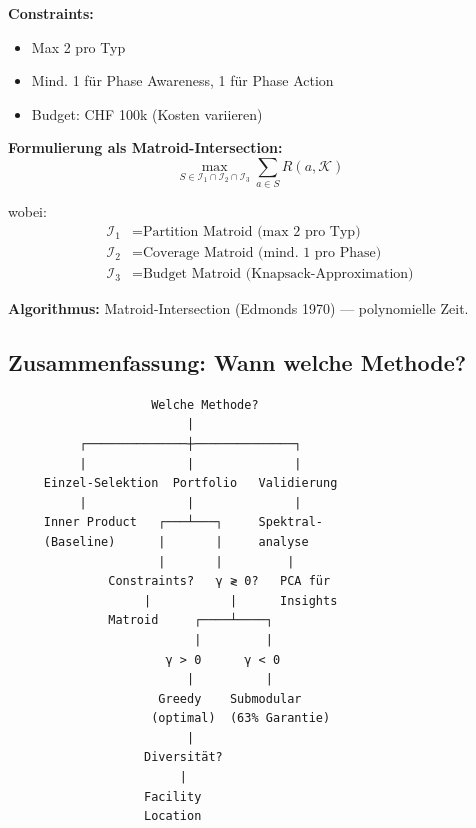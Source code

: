 \begin{tcolorbox}[colback=yellow!5!white, colframe=yellow!75!black,
    title=\textbf{Beispiel: Constrained Portfolio Selection}]

\textbf{Constraints:}
\begin{itemize}[nosep]
    \item Max 2 pro Typ
    \item Mind. 1 für Phase Awareness, 1 für Phase Action
    \item Budget: CHF 100k (Kosten variieren)
\end{itemize}

\textbf{Formulierung als Matroid-Intersection:}
\begin{equation}
\max_{S \in \mathcal{I}_1 \cap \mathcal{I}_2 \cap \mathcal{I}_3} \sum_{a \in S} R(a, \mathcal{K})
\end{equation}

wobei:
\begin{align*}
\mathcal{I}_1 &= \text{Partition Matroid (max 2 pro Typ)} \\
\mathcal{I}_2 &= \text{Coverage Matroid (mind. 1 pro Phase)} \\
\mathcal{I}_3 &= \text{Budget Matroid (Knapsack-Approximation)}
\end{align*}

\textbf{Algorithmus:} Matroid-Intersection (Edmonds 1970) --- polynomielle Zeit.

\end{tcolorbox}

\subsection{Zusammenfassung: Wann welche Methode?}

\begin{tcolorbox}[colback=blue!5!white, colframe=blue!75!black,
    title=\textbf{Entscheidungsbaum: Mathematische Methoden}]

\begin{verbatim}
                    Welche Methode?
                         |
          ┌──────────────┼──────────────┐
          |              |              |
     Einzel-Selektion  Portfolio   Validierung
          |              |              |
     Inner Product   ┌───┴───┐     Spektral-
     (Baseline)      |       |     analyse
                     |       |         |
              Constraints?   γ ≷ 0?   PCA für
                   |           |      Insights
              Matroid     ┌────┴────┐
                          |         |
                      γ > 0      γ < 0
                         |          |
                     Greedy    Submodular
                    (optimal)  (63% Garantie)
                         |
                   Diversität?
                        |
                   Facility
                   Location
\end{verbatim}

\end{tcolorbox}

